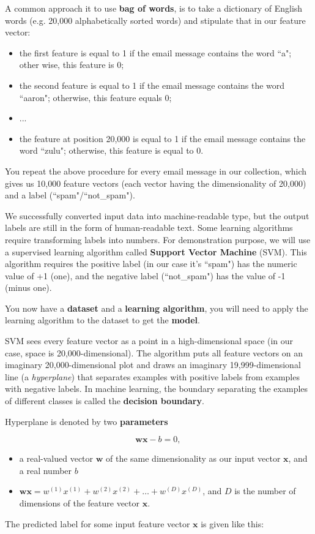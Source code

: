 A common approach it to use \textbf{bag of words}, is to take a dictionary of English words (e.g. 20,000 alphabetically sorted words) and stipulate that in our feature vector:
\begin{itemize}
	\item the first feature is equal to 1 if the email message contains the word ``a"; other wise, this feature is 0;
	\item the second feature is equal to 1 if the email message contains the word ``aaron"; otherwise, this feature equals 0;
	\item ...
	\item the feature at position 20,000 is equal to 1 if the email message contains the word ``zulu"; otherwise, this feature is equal to 0.
\end{itemize}
You repeat the above procedure for every email message in our collection, which gives us 10,000 feature vectors (each vector having the dimensionality of 20,000) and a label (``spam"/``not\_spam").

We successfully converted input data into machine-readable type, but the output labels are still in the form of human-readable text. Some learning algorithms require transforming labels into numbers. For demonstration purpose, we will use a supervised learning algorithm called \textbf{Support Vector Machine} (SVM). This algorithm requires the positive label (in our case it's ``spam") has the numeric value of +1 (one), and the negative label (``not\_spam") has the value of -1 (minus one).

You now have a \textbf{dataset} and a \textbf{learning algorithm}, you will need to apply the learning algorithm to the dataset to get the \textbf{model}.

SVM sees every feature vector as a point in a high-dimensional space (in our case, space is 20,000-dimensional). The algorithm puts all feature vectors on an imaginary 20,000-dimensional plot and draws an imaginary 19,999-dimensional line (a \textit{hyperplane}) that separates examples with positive labels from examples with negative labels. In machine learning, the boundary separating the examples of different classes is called the \textbf{decision boundary}.

Hyperplane is denoted by two \textbf{parameters}

\[ \mathbf{w} \mathbf{x}-b=0 \text {, } \]
\begin{itemize}
	\item a real-valued vector $\mathbf{w}$ of the same dimensionality as our input vector $\mathbf{x}$, and a real number $b$
	\item $\mathbf{w} \mathbf{x}= w^{(1)} x^{(1)}+w^{(2)} x^{(2)}+\ldots+w^{(D)} x^{(D)}$, and $D$ is the number of dimensions of the feature vector $\mathbf{x}$.
\end{itemize}
The predicted label for some input feature vector $\mathbf{x}$ is given like this:

